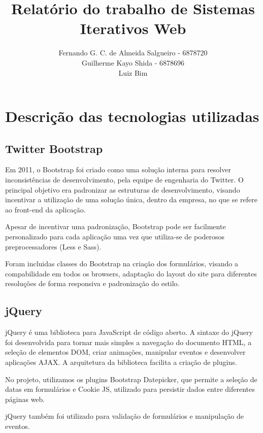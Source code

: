 \documentclass{article}
\begin{document}
\setmainfont{Nimbus Sans L}
\title{Relatório do trabalho de Sistemas Iterativos Web}
\author{Fernando G. C. de Almeida Salgueiro - 6878720\\ Guilherme Kayo Shida - 6878696\\ Luiz Bim}

\maketitle

\setmainfont{URW Palladio L}

\section{Descrição das tecnologias utilizadas}
\subsection{Twitter Bootstrap}
Em 2011, o Bootstrap foi criado como uma solução interna para resolver inconsistências de desenvolvimento, pela equipe de engenharia do Twitter. O principal objetivo era padronizar as estruturas de desenvolvimento, visando incentivar a utilização de uma solução única, dentro da empresa, no que se refere ao front-end da aplicação. 

Apesar de incentivar uma padronização, Bootstrap pode ser facilmente personalizado para cada aplicação uma vez que utiliza-se de poderosos preprocessadores (Less e Sass).

Foram incluidas classes do Bootstrap na criação dos formulários, visando  a compabilidade em todos os browsers, adaptação do layout do site para diferentes resoluções de forma responsiva e padronização do estilo.

\subsection{jQuery}
jQuery é uma biblioteca para JavaScript de código aberto. A sintaxe do jQuery foi desenvolvida para tornar mais simples a navegação do documento HTML, a seleção de elementos DOM, criar animações, manipular eventos e desenvolver aplicações AJAX. A arquitetura da biblioteca facilita a criação de plugins.

No projeto, utilizamos os plugins Bootstrap Datepicker, que permite a seleção de datas em formulários e Cookie JS, utilizado para persistir dados entre diferentes páginas web.

jQuery também foi utilizado para validação de formulários e manipulação de eventos.
\end{document}
